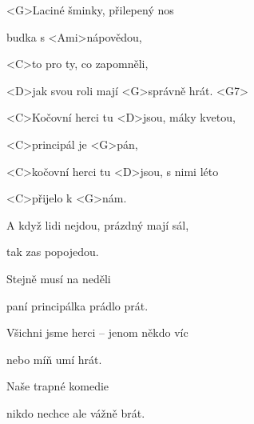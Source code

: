 
\zs
<G>Laciné šminky, přilepený nos

budka s <Ami>nápovědou,

<C>to pro ty, co zapomněli,

<D>jak svou roli mají <G>správně hrát. <G7> 
\ks
\zr

<C>Kočovní herci tu <D>jsou, máky kvetou,

<C>principál je <G>pán,

<C>kočovní herci tu <D>jsou, s nimi léto

<C>přijelo k <G>nám.
\kr
\zs

A když lidi nejdou, prázdný mají sál,

tak zas popojedou.

Stejně musí na neděli

paní principálka prádlo prát.

\ks
\zr \kr
\zs


Všichni jsme herci -- jenom někdo víc

nebo míň umí hrát.

Naše trapné komedie

nikdo nechce ale vážně brát.
\ks

\zr
\kr

\kp
